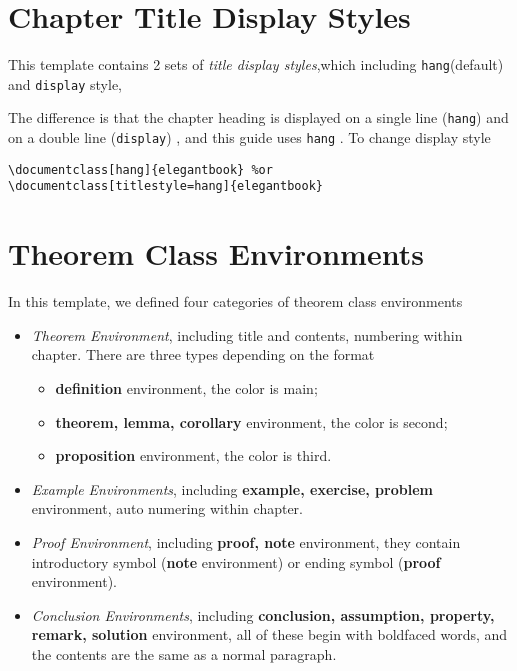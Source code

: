 \documentclass[noanswer,fancy,blue,11pt]{elegantbook}
\begin{document}
\section{Chapter Title Display Styles}

This template contains 2 sets of \textit{title display styles},which including \lstinline{hang}(default) and \lstinline{display} style, 

The difference is that the chapter heading is displayed on a single line (\lstinline{hang}) and on a double line (\lstinline{display}) , and this guide uses \lstinline{hang} . To change display style
\begin{lstlisting}
\documentclass[hang]{elegantbook} %or
\documentclass[titlestyle=hang]{elegantbook}
\end{lstlisting}

\section{Theorem Class Environments}

In this template, we defined four categories of theorem class environments

\begin{itemize}
\item \textit{Theorem Environment}, including title and contents, numbering within chapter. There are three types depending on the format
   \begin{itemize}
      \item \textcolor{main}{\textbf{definition}} environment, the color is  \textcolor{main}{main};
      \item \textcolor{second}{\textbf{theorem, lemma, corollary}} environment, the color is \textcolor{second} {second};
      \item \textcolor{third}{\textbf{proposition}} environment, the color is \textcolor{third}{third}.
   \end{itemize}
\item \textit{Example Environments}, including \textbf{example, exercise, problem} environment, auto numering within chapter.
\item \textit{Proof Environment}, including \textbf{proof, note} environment, they contain introductory symbol (\textbf{note} environment) or ending symbol (\textbf{proof} environment).
\item \textit{Conclusion Environments}, including \textbf{conclusion, assumption, property, remark, solution} environment, all of these begin with boldfaced words, and the contents are the same as a normal paragraph.
\end{itemize}
\end{document}
